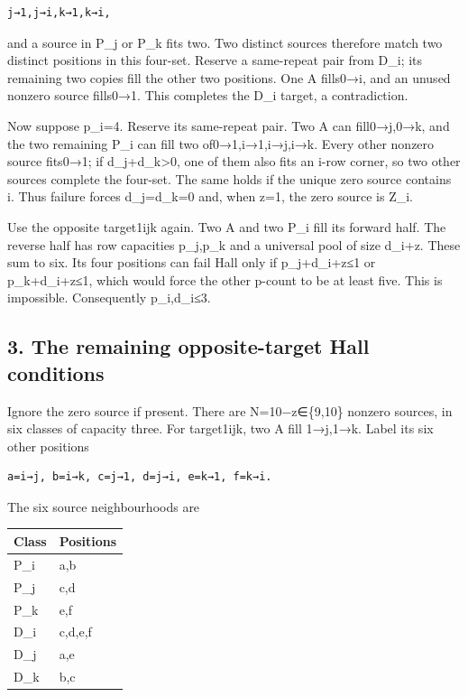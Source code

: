 \documentclass[
  10pt,
]{article}
\begin{document}
\begin{verbatim}
j→1,j→i,k→1,k→i,
\end{verbatim}

and a source in P\_j or P\_k fits two. Two distinct sources therefore
match two distinct positions in this four-set. Reserve a same-repeat
pair from D\_i; its remaining two copies fill the other two positions.
One A fills0→i, and an unused nonzero source fills0→1. This completes
the D\_i target, a contradiction.

Now suppose p\_i=4. Reserve its same-repeat pair. Two A can fill0→j,0→k,
and the two remaining P\_i can fill two of0→1,i→1,i→j,i→k. Every other
nonzero source fits0→1; if d\_j+d\_k\textgreater0, one of them also fits
an i-row corner, so two other sources complete the four-set. The same
holds if the unique zero source contains i. Thus failure forces
d\_j=d\_k=0 and, when z=1, the zero source is Z\_i.

Use the opposite target1i\textbar jk again. Two A and two P\_i fill its
forward half. The reverse half has row capacities p\_j,p\_k and a
universal pool of size d\_i+z. These sum to six. Its four positions can
fail Hall only if p\_j+d\_i+z≤1 or p\_k+d\_i+z≤1, which would force the
other p-count to be at least five. This is impossible. Consequently
p\_i,d\_i≤3.

\hypertarget{the-remaining-opposite-target-hall-conditions}{%
\subsection*{3. The remaining opposite-target Hall
conditions}\label{the-remaining-opposite-target-hall-conditions}}

Ignore the zero source if present. There are N=10−z∈\{9,10\} nonzero
sources, in six classes of capacity three. For target1i\textbar jk, two
A fill 1→j,1→k. Label its six other positions

\begin{verbatim}
a=i→j, b=i→k, c=j→1, d=j→i, e=k→1, f=k→i.
\end{verbatim}

The six source neighbourhoods are

\begin{longtable}[]{@{}ll@{}}
\toprule\noalign{}
Class & Positions \\
\midrule\noalign{}
\endhead
\bottomrule\noalign{}
\endlastfoot
P\_i & a,b \\
P\_j & c,d \\
P\_k & e,f \\
D\_i & c,d,e,f \\
D\_j & a,e \\
D\_k & b,c \\
\end{longtable}
\end{document}
